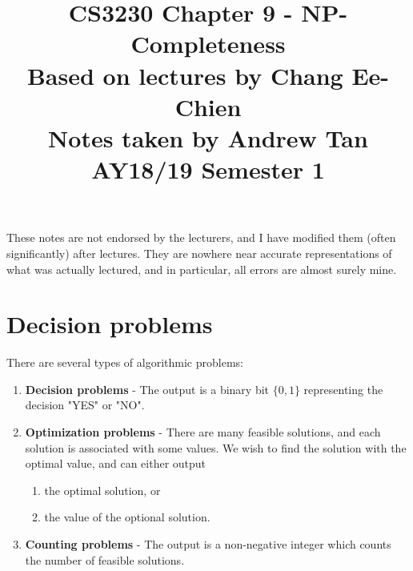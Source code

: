 \documentclass[a4paper]{article}
\title{%
	CS3230 Chapter 9 - NP-Completeness \\
	\large Based on lectures by Chang Ee-Chien
	\\ Notes taken by Andrew Tan
	\\ AY18/19 Semester 1
	\\ }
\author{}
\date{\vspace{-5ex}}
\begin{document}
\maketitle

\begin{center}\begin{minipage}[c]{0.9\textwidth}\centering\footnotesize These notes are not endorsed by the lecturers, and I have modified them (often significantly) after lectures. They are nowhere near accurate representations of what was actually lectured, and in particular, all errors are almost surely mine.\end{minipage}\end{center}

\section{Decision problems}
There are several types of algorithmic problems:
\begin{enumerate}
	\item \textbf{Decision problems} - The output is a binary bit $\{0,1\}$ representing the decision "YES" or "NO".
	\item \textbf{Optimization problems} - There are many feasible solutions, and each solution is associated with some values. We wish to find the solution with the optimal value, and can either output
	\begin{enumerate}
		\item the optimal solution, or
		\item the value of the optional solution.
	\end{enumerate}
	\item \textbf{Counting problems} - The output is a non-negative integer which counts the number of feasible solutions.
\end{enumerate}
\end{document}
